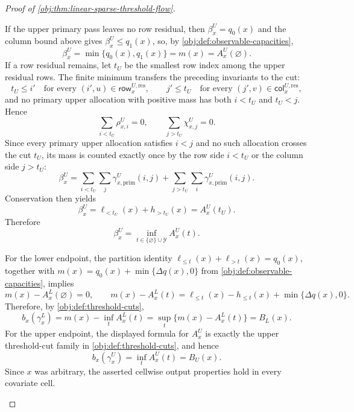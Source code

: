 \begin{proof}[Proof of \cref{obj:thm:linear-sparse-threshold-flow}]
\begin{enumerate}
If the upper primary pass leaves no row residual, then \(\beta_x^U=q_0(x)\) and the column bound above gives \(\beta_x^U\le q_1(x)\), so, by \cref{obj:def:observable-capacities},
\[
\beta_x^U=\min\{q_0(x),q_1(x)\}=m(x)=A_x^U(\varnothing).
\]
If a row residual remains, let \(t_U\) be the smallest row index among the upper residual rows.  The finite minimum transfers the preceding invariants to the cut:
\[
t_U\le i'\quad\text{for every }(i',u)\in\mathsf{row}_{x}^{U,\mathrm{res}},
\qquad
j'\le t_U\quad\text{for every }(j',v)\in\mathsf{col}_{x}^{U,\mathrm{res}},
\]
and no primary upper allocation with positive mass has both \(i<t_U\) and \(t_U<j\).  Hence
\[
\sum_{i<t_U}\rho_{x,i}^U=0,
\qquad
\sum_{j>t_U}\chi_{x,j}^U=0.
\]
Since every primary upper allocation satisfies \(i<j\) and no such allocation crosses the cut \(t_U\), its mass is counted exactly once by the row side \(i<t_U\) or the column side \(j>t_U\):
\[
\beta_x^U
=
\sum_{i<t_U}\sum_j\gamma_{x,\mathrm{prim}}^U(i,j)
+
\sum_{j>t_U}\sum_i\gamma_{x,\mathrm{prim}}^U(i,j).
\]
Conservation then yields
\[
\beta_x^U
=
\ell_{<t_U}(x)+h_{>t_U}(x)
=A_x^U(t_U).
\]
Therefore
\[
\beta_x^U
=
\inf_{t\in\{\varnothing\}\cup\mathcal Y} A_x^U(t).
\]

For the lower endpoint, the partition identity \(\ell_{\le t}(x)+\ell_{>t}(x)=q_0(x)\), together with \(m(x)=q_0(x)+\min\{\Delta q(x),0\}\) from \cref{obj:def:observable-capacities}, implies
\[
m(x)-A_x^L(\varnothing)=0,
\qquad
m(x)-A_x^L(t)
=\ell_{\le t}(x)-h_{\le t}(x)+\min\{\Delta q(x),0\}.
\]
Therefore, by \cref{obj:def:threshold-cuts},
\[
b_x(\gamma_x^L)
=m(x)-\inf_t A_x^L(t)
=\sup_t\{m(x)-A_x^L(t)\}
=B_L(x).
\]
For the upper endpoint, the displayed formula for \(A_x^U\) is exactly the upper threshold-cut family in \cref{obj:def:threshold-cuts}, and hence
\[
b_x(\gamma_x^U)
=\inf_t A_x^U(t)
=B_U(x).
\]
Since \(x\) was arbitrary, the asserted cellwise output properties hold in every covariate cell.
\end{enumerate}
\end{proof}

